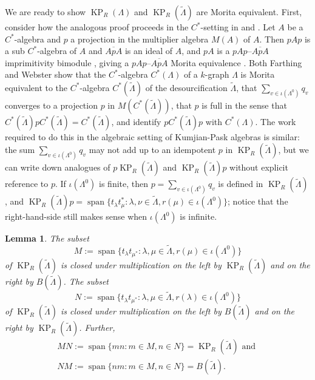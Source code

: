 \documentclass[a4paper,12pt]{amsart}
\numberwithin{equation}{section}
\newtheorem{lemma}[thm]{Lemma}
\theoremstyle{definition}
\theoremstyle{remark}
\begin{document}
We are ready to show $\operatorname{KP}_R(\Lambda)$ and $\operatorname{KP}_R({\tilde{\Lambda}})$ are Morita equivalent.  First,  consider
how the analogous proof  proceeds in the $C^*$-setting in \cite{W} and \cite{F}. 
Let $A$ be a $C^*$-algebra and $p$ a projection in the multiplier algebra $M(A)$ of $A$. Then $pAp$ 
is a sub $C^*$-algebra of $A$ and $\overline{ApA}$ is an ideal of $A$, and $pA$ is a $pAp$--$\overline{ApA}$ 
imprimitivity bimodule , giving a $pAp$--$\overline{ApA}$ Morita equivalence \cite[Example~2.12]{tfb}.  
Both  Farthing and Webster show that the $C^*$-algebra $C^*(\Lambda)$ of a $k$-graph $\Lambda$ is
 Morita equivalent to the $C^*$-algebra $C^*(\tilde\Lambda)$ of the  desourcification $\tilde\Lambda$, 
that $\sum_{v \in \iota(\Lambda^0)} q_v$ converges to a projection $p$ in $M(C^*(\tilde\Lambda))$,
 that $p$ is full in the sense that $C^*(\tilde\Lambda)pC^*(\tilde\Lambda)=C^*(\tilde\Lambda)$, and 
identify $pC^*(\tilde\Lambda)p$ with $C^*(\Lambda)$.  The work required to do this in the algebraic setting of Kumjian-Pask algebras is similar: the sum  $\sum_{v \in \iota(\Lambda^0)} q_v$  may not add up to an idempotent $p$ in $\operatorname{KP}_R(\tilde\Lambda)$, but we can write down  
analogues of $p\operatorname{KP}_R(\tilde\Lambda)$ and $\operatorname{KP}_R(\tilde\Lambda)p$ without explicit reference to $p$.  
If $\iota(\Lambda^0)$ is finite, then $p=\sum_{v \in \iota(\Lambda^0)} q_v$ is defined in $\operatorname{KP}_R(\tilde\Lambda)$, and $\operatorname{KP}_R(\tilde\Lambda)p={\operatorname{\mathrm{span}}}\{t_\lambda t_\mu^*:\lambda,\nu\in\tilde\Lambda, r(\mu)\in\iota(\Lambda^0)\}$; notice that the right-hand-side still makes sense when $\iota(\Lambda^0)$ is infinite.

\begin{lemma}\label{lem-helpMorita} The subset \[M := {\operatorname{\mathrm{span}}}\{t_{\lambda}t_{\mu^*} : \lambda, \mu \in \tilde{\Lambda}, r(\mu)\in \iota(\Lambda^0)\}\] of $\operatorname{KP}_R(\tilde\Lambda)$ is closed under multiplication on the left by $\operatorname{KP}_R(\tilde\Lambda)$ and on the right by $B(\tilde\Lambda)$.  The subset \[N := {\operatorname{\mathrm{span}}}\{t_{\lambda}t_{\mu^*} : \lambda, \mu \in \tilde{\Lambda}, r(\lambda)\in \iota(\Lambda^0)\}\] of $\operatorname{KP}_R(\tilde\Lambda)$ is closed under multiplication on the left by $B(\tilde\Lambda)$ and on the right by $\operatorname{KP}_R(\tilde\Lambda)$.  Further,
\begin{gather*}
MN:={\operatorname{\mathrm{span}}}\{mn:m\in M, n\in N\}=\operatorname{KP}_R(\tilde\Lambda)\text{\ and\ } \\NM:={\operatorname{\mathrm{span}}}\{nm:m\in M, n\in N\}=B(\tilde\Lambda).
\end{gather*}
\end{lemma}
\end{document}
